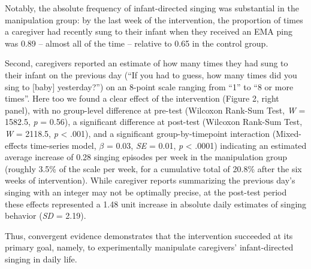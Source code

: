 \documentclass[
]{article}
\begin{document}
Notably, the absolute frequency of infant-directed singing was
substantial in the manipulation group: by the last week of the
intervention, the proportion of times a caregiver had recently sung to
their infant when they received an EMA ping was 0.89 -- almost all of
the time -- relative to 0.65 in the control group.

Second, caregivers reported an estimate of how many times they had sung
to their infant on the previous day (``If you had to guess, how many
times did you sing to {[}baby{]} yesterday?'') on an 8-point scale
ranging from ``1'' to ``8 or more times''. Here too we found a clear
effect of the intervention (Figure 2, right panel), with no group-level
difference at pre-test (Wilcoxon Rank-Sum Test, \emph{W} = 1582.5,
\emph{p} = 0.56), a significant difference at post-test (Wilcoxon
Rank-Sum Test, \emph{W} = 2118.5, \emph{p} \textless{} .001), and a
significant group-by-timepoint interaction (Mixed-effects time-series
model, \(\beta\) = 0.03, \emph{SE} = 0.01, \emph{p} \textless{} .0001)
indicating an estimated average increase of 0.28 singing episodes per
week in the manipulation group (roughly 3.5\% of the scale per week, for
a cumulative total of 20.8\% after the six weeks of intervention). While
caregiver reports summarizing the previous day's singing with an integer
may not be optimally precise, at the post-test period these effects
represented a 1.48 unit increase in absolute daily estimates of singing
behavior (\emph{SD} = 2.19).

Thus, convergent evidence demonstrates that the intervention succeeded
at its primary goal, namely, to experimentally manipulate caregivers'
infant-directed singing in daily life.
\end{document}
